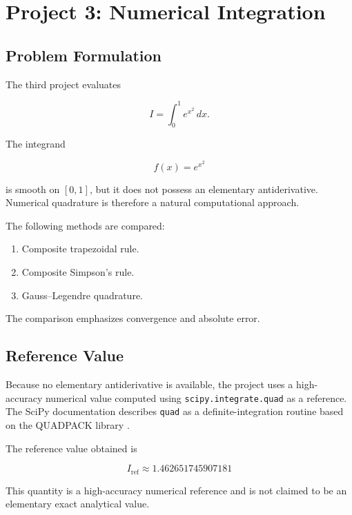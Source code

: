 \documentclass[11pt,a4paper]{article}
\begin{document}
\newpage

\section{Project 3: Numerical Integration}

\subsection{Problem Formulation}

The third project evaluates

\[
I=
\int_0^1e^{x^2}\,dx.
\]

The integrand

\[
f(x)=e^{x^2}
\]

is smooth on $[0,1]$, but it does not possess an elementary
antiderivative. Numerical quadrature is therefore a natural computational
approach.

The following methods are compared:

\begin{enumerate}
    \item Composite trapezoidal rule.
    \item Composite Simpson's rule.
    \item Gauss--Legendre quadrature.
\end{enumerate}

The comparison emphasizes convergence and absolute error.


\subsection{Reference Value}

Because no elementary antiderivative is available, the project uses a
high-accuracy numerical value computed using
\texttt{scipy.integrate.quad} as a reference. The SciPy documentation
describes \texttt{quad} as a definite-integration routine based on the
QUADPACK library \cite{scipy_quad,piessens1983}.

The reference value obtained is

\[
\boxed{
I_{\mathrm{ref}}
\approx
1.462651745907181
}
\]

This quantity is a high-accuracy numerical reference and is not claimed to
be an elementary exact analytical value.
\end{document}
